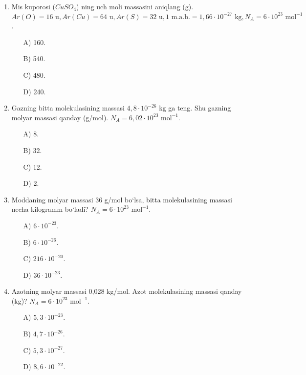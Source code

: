 \begin{enumerate}
\begin{itemize}
    \end{itemize}

    \item Mis kuporosi ($CuSO_4$) ning uch moli massasini aniqlang (g). $Ar(O)=16 \text{ u}, Ar(Cu)=64 \text{ u}, Ar(S)=32 \text{ u}, 1 \text{ m.a.b.} = 1,66 \cdot 10^{-27} \text{ kg}, N_A = 6 \cdot 10^{23} \text{ mol}^{-1}$.
    \begin{itemize}
        \item[A)] 160.
        \item[B)] 540.
        \item[C)] 480.
        \item[D)] 240.
       
    \end{itemize}

    \item Gazning bitta molekulasining massasi $4,8 \cdot 10^{-26} \text{ kg}$ ga teng. Shu gazning molyar massasi qanday (g/mol). $N_A = 6,02 \cdot 10^{23} \text{ mol}^{-1}$.
    \begin{itemize}
        \item[A)] 8.
        \item[B)] 32.
        \item[C)] 12.
        \item[D)] 2.
       
    \end{itemize}

    \item Moddaning molyar massasi 36 g/mol bo‘lsa, bitta molekulasining massasi necha kilogramm bo‘ladi? $N_A = 6 \cdot 10^{23} \text{ mol}^{-1}$.
    \begin{itemize}
        \item[A)] $6 \cdot 10^{-23}$.
        \item[B)] $6 \cdot 10^{-26}$.
        \item[C)] $216 \cdot 10^{-20}$.
        \item[D)] $36 \cdot 10^{-23}$.
        
    \end{itemize}

    \item Azotning molyar massasi 0,028 kg/mol. Azot molekulasining massasi qanday (kg)? $N_A = 6 \cdot 10^{23} \text{ mol}^{-1}$.
    \begin{itemize}
        \item[A)] $5,3 \cdot 10^{-23}$.
        \item[B)] $4,7 \cdot 10^{-26}$.
        \item[C)] $5,3 \cdot 10^{-27}$.
        \item[D)] $8,6 \cdot 10^{-22}$.
       

\end{itemize}
\end{enumerate}
